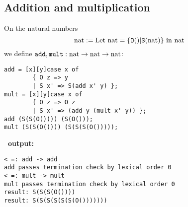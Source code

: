 





\subsection{Addition and multiplication\label{ex:add}}
On the natural numbers
$$
    \mathrm{nat} := \mathrm{Let}\ \mathrm{nat} = \{ \mathtt{O()}|\mathtt{S(}\mathrm{nat}\mathtt{)} \}\ \mathrm{in}\ \mathrm{nat}
$$
we define $\mathtt{add},\mathtt{mult} : \mathrm{nat} \rightarrow \mathrm{nat} \rightarrow \mathrm{nat}$:
\begin{verbatim}
add = [x][y]case x of
        { O z => y
        | S x' => S(add x' y) };
mult = [x][y]case x of
        { O z => O z
        | S x' => (add y (mult x' y)) };
add (S(S(O()))) (S(O()));
mult (S(S(O()))) (S(S(S(O()))));
\end{verbatim}
{\bf\foetus\ output:}\nopagebreak[4]
\begin{verbatim}
< =: add -> add
add passes termination check by lexical order 0
< =: mult -> mult
mult passes termination check by lexical order 0
result: S(S(S(O())))
result: S(S(S(S(S(S(O()))))))
\end{verbatim}

